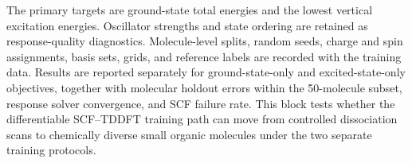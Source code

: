 The primary targets are ground-state total energies and the lowest
vertical excitation energies. Oscillator strengths and state ordering
are retained as response-quality diagnostics. Molecule-level splits,
random seeds, charge and spin assignments, basis sets, grids, and
reference labels are recorded with the training data. Results are
reported separately for ground-state-only and excited-state-only
objectives, together with molecular holdout errors within the
50-molecule subset, response solver convergence, and SCF failure
rate. This block tests whether the differentiable SCF--TDDFT
training path can move from controlled dissociation scans to
chemically diverse small organic molecules under the two separate
training protocols.
